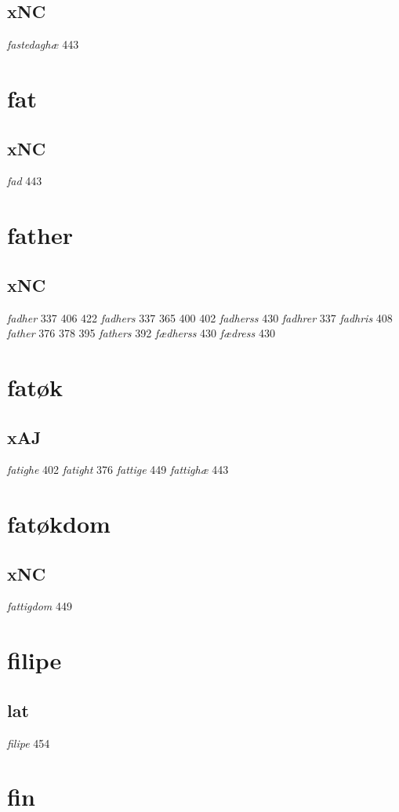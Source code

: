 \documentclass[a4paper,twocolumn]{article}
\begin{document}
\subsection{xNC}
\label{sec:org5e5edda}
\emph{fastedaghæ} 443 
\section{fat}
\label{sec:org80786f0}
\subsection{xNC}
\label{sec:orgfd16a85}
\emph{fad} 443 
\section{father}
\label{sec:orgaff8b86}
\subsection{xNC}
\label{sec:orgcf750ab}
\emph{fadher} 337 406 422 \emph{fadhers} 337 365 400 402 \emph{fadherss} 430 \emph{fadhrer} 337 \emph{fadhris} 408 \emph{father} 376 378 395 \emph{fathers} 392 \emph{fædherss} 430 \emph{fædress} 430 
\section{fatøk}
\label{sec:org1c2c9c7}
\subsection{xAJ}
\label{sec:org04ec82e}
\emph{fatighe} 402 \emph{fatight} 376 \emph{fattige} 449 \emph{fattighæ} 443 
\section{fatøkdom}
\label{sec:org29962da}
\subsection{xNC}
\label{sec:org6593d67}
\emph{fattigdom} 449 
\section{filipe}
\label{sec:orgc153ee7}
\subsection{lat}
\label{sec:orgcb80a20}
\emph{filipe} 454 
\section{fin}
\label{sec:org3bb2d53}
\end{document}
